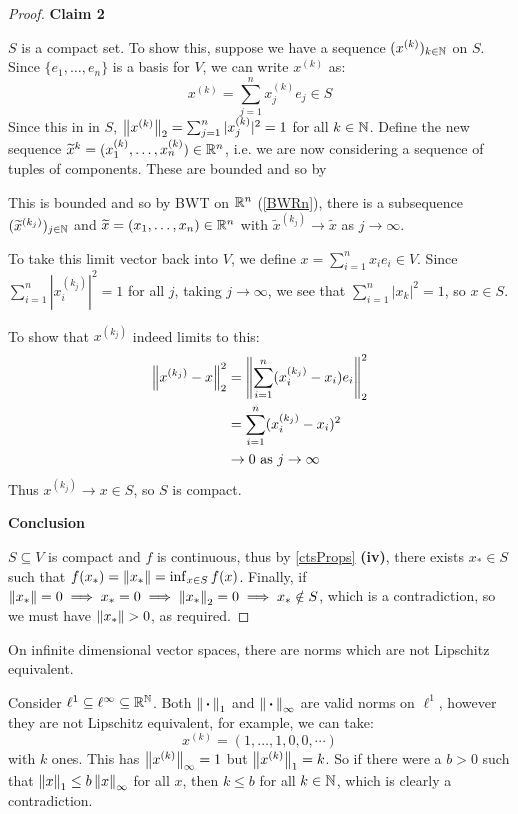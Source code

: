 \documentclass[../main.tex]{subfiles}
\begin{document}
\begin{proof}
  \textbf{Claim 2}\par
  $S$ is a compact set.
  To show this, suppose we have a sequence $(x^{(k)})_{k \in \mathbb{N}}$ on $S$.
  Since $\{e_1, \ldots, e_n\}$ is a basis for $V$, we can write $x^{(k)}$ as:
  \[
    x^{(k)} = \sum_{j = 1}^{n} x^{(k)}_j e_j \in S
  \]
  Since this in in $S$, $\left\lVert x^{(k)} \right\rVert_2 = \sum_{j = 1}^{n} |x^{(k)}_j|^2 = 1$ for all $k \in \mathbb{N}$.
  Define the new sequence $\widetilde{x}^{k} = (x^{(k)}_1, \ldots, x^{(k)}_n) \in \mathbb{R}^{n}$, i.e. we are now considering a sequence of tuples of components.
  These are bounded and so by

  This is bounded and so by BWT on $\mathbb{R}^{n}$ (\cref{BWRn}), there is a subsequence $(\widetilde{x}^{(k_j)})_{j \in \mathbb{N}}$ and $\widetilde{x} = (x_1, \ldots, x_n) \in \mathbb{R}^{n}$ with $\widetilde{x}^{(k_j)} \to \widetilde{x}$ as $j \to \infty$.

  To take this limit vector back into $V$, we define $x = \sum_{i = 1}^{n} x_i e_i \in V$.
  Since $\sum_{i = 1}^{n} |x^{(k_j)}_i|^2 = 1$ for all $j$, taking $j \to \infty$, we see that $\sum_{i = 1}^{n} |x_k|^2 = 1$, so $x \in S$.

  To show that $x^{(k_j)}$ indeed limits to this:
  \begin{align*}
    \left\lVert x^{(k_j)} - x \right\rVert^{2}_{2} &= \left\lVert \sum_{i = 1}^{n} (x^{(k_j)}_i - x_i) e_i \right\rVert^2_2 \\
                                 &= \sum_{i = 1}^{n} (x^{(k_j)}_i - x_i)^2 \\
                                 &\to 0 \text{ as $j \to \infty$}
  \end{align*}
  Thus $x^{(k_j)} \to x \in S$, so $S$ is compact.

  \textbf{Conclusion}\par
  $S \subseteq V$ is compact and $f$ is continuous, thus by \cref{ctsProps} \textbf{(iv)}, there exists $x_{*} \in S$ such that $f(x_{*}) = \left\lVert x_{*} \right\rVert = \inf_{x \in S} f(x)$.
  Finally, if $\left\lVert x_{*} \right\rVert = 0 \implies x_{*} = 0 \implies \left\lVert x_{*} \right\rVert_2 = 0 \implies x_{*} \notin S$, which is a contradiction, so we must have $\left\lVert x_{*} \right\rVert > 0$, as required.
\end{proof}
On infinite dimensional vector spaces, there are norms which are not Lipschitz equivalent.
\begin{example}
  Consider $\ell^1 \subseteq \ell^{\infty} \subseteq \mathbb{R}^{\mathbb{N}}$.
  Both $\left\lVert {\hspace{0.18em}\boldsymbol{\cdot}\hspace{0.18em}} \right\rVert_1$ and $\left\lVert {\hspace{0.18em}\boldsymbol{\cdot}\hspace{0.18em}} \right\rVert_{\infty}$ are valid norms on $\ell^{1}$, however they are not Lipschitz equivalent, for example, we can take:
  \[
    x^{(k)} = (1, \ldots, 1, 0, 0, \cdots)
  \]
  with $k$ ones.
  This has $\left\lVert x^{(k)} \right\rVert_{\infty} = 1$ but $\left\lVert x^{(k)} \right\rVert_1 = k$.
  So if there were a $b > 0$ such that $\left\lVert x \right\rVert_1 \leq b \left\lVert x \right\rVert_{\infty}$ for all $x$, then $k \leq b$ for all $k \in \mathbb{N}$, which is clearly a contradiction.
\end{example}
\end{document}
